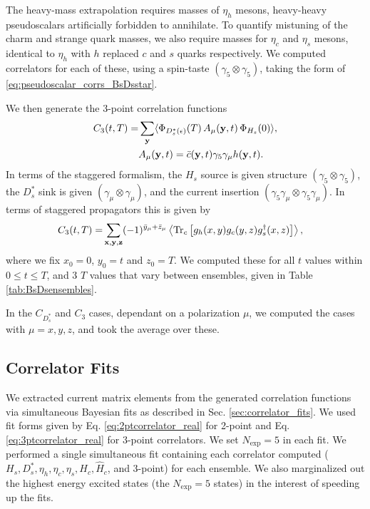 The heavy-mass extrapolation requires masses of $\eta_h$ mesons, heavy-heavy pseudoscalars artificially forbidden to annihilate. To quantify mistuning of the charm and strange quark masses, we also require masses for $\eta_c$ and $\eta_s$ mesons, identical to $\eta_h$ with $h$ replaced $c$ and $s$ quarks respectively. We computed correlators for each of these, using a spin-taste $(\gamma_5\otimes \gamma_5)$, taking the form of \eqref{eq:pseudoscalar_corrs_BsDsstar}.

We then generate the 3-point correlation functions
\begin{align}
  C_3(t,T) =& \sum_{{\bf{y}}} \langle \Phi_{D_s^*(\epsilon)}(T)\, A_{\mu}({\bf{y}},t) \,\Phi_{H_s}(0) \rangle, \\
  &A_{\mu}({\bf{y}},t) = \bar{c}({\bf{y}},t) \gamma_5\gamma_{\mu} h({\bf{y}},t). \nonumber
\end{align}
In terms of the staggered formalism, the $H_s$ source is given structure $(\gamma_5\otimes \gamma_5)$, the $D_s^*$ sink is given $(\gamma_{\mu}\otimes \gamma_{\mu})$, and the current insertion $(\gamma_5\gamma_{\mu}\otimes \gamma_5\gamma_{\mu})$. In terms of staggered propagators this is given by
\begin{align}
  C_3(t,T) =& \sum_{{\bf{x},\bf{y},\bf{z}}} (-1)^{\bar{y}_{\mu}+\bar{z}_{\mu}}\left\langle \text{Tr}_c\left[ g_h(x,y)g_c(y,z) g^{\dagger}_s(x,z) \right] \right\rangle,
\end{align}
where we fix $x_0 = 0$, $y_0=t$ and $z_0=T$. We computed these for all $t$ values within $0\leq t\leq T$, and 3 $T$ values that vary between ensembles, given in Table \ref{tab:BsDsensembles}.

In the $C_{D_s^*}$ and $C_3$ cases, dependant on a polarization $\mu$, we computed the cases with $\mu = x,y,z$, and took the average over these.

\subsection{Correlator Fits}
\label{sec:BsDsstar_fits}

We extracted current matrix elements from the generated correlation functions via simultaneous Bayesian fits as described in Sec. \ref{sec:correlator_fits}. We used fit forms given by Eq. \eqref{eq:2ptcorrelator_real} for 2-point and Eq. \eqref{eq:3ptcorrelator_real} for 3-point correlators. We set $N_{\text{exp}}=5$ in each fit. We performed a single simultaneous fit containing each correlator computed ($H_s,D_s^*,\eta_h,\eta_c,\eta_s,H_c,\hat{H}_c$, and 3-point) for each ensemble. We also marginalized out the highest energy excited states (the $N_{\text{exp}}=5$ states) in the interest of speeding up the fits.

